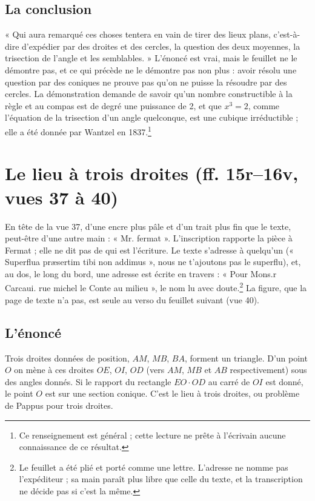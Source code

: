 \documentclass[11pt,a4paper]{article}
\begin{document}
\subsection*{La conclusion}

« Qui aura remarqué ces choses tentera en vain de tirer des lieux plans,
c'est-à-dire d'expédier par des droites et des cercles, la question des deux
moyennes, la trisection de l'angle et les semblables. » L'énoncé est vrai, mais
le feuillet ne le démontre pas, et ce qui précède ne le démontre pas non plus :
avoir résolu une question par des coniques ne prouve pas qu'on ne puisse la
résoudre par des cercles. La démonstration demande de savoir qu'un nombre
constructible à la règle et au compas est de degré une puissance de 2, et que
$x^3 = 2$, comme l'équation de la trisection d'un angle quelconque, est une
cubique irréductible ; elle a été donnée par Wantzel en 1837.\footnote{Ce
renseignement est général ; cette lecture ne prête à l'écrivain aucune
connaissance de ce résultat.}

\section*{Le lieu à trois droites (ff. 15r–16v, vues 37 à 40)}

En tête de la vue 37, d'une encre plus pâle et d'un trait plus fin que le
texte, peut-être d'une autre main : « Mr. fermat ». L'inscription rapporte la
pièce à Fermat ; elle ne dit pas de qui est l'écriture. Le texte s'adresse à
quelqu'un (« Superflua præsertim tibi non addimus », nous ne t'ajoutons pas le
superflu), et, au dos, le long du bord, une adresse est écrite en travers :
« Pour Mons.r Carcaui. rue michel le Conte au milieu », le nom lu avec
doute.\footnote{Le feuillet a été plié et porté comme une lettre. L'adresse ne
nomme pas l'expéditeur ; sa main paraît plus libre que celle du texte, et la
transcription ne décide pas si c'est la même.} La figure, que la page de texte
n'a pas, est seule au verso du feuillet suivant (vue 40).

\subsection*{L'énoncé}

Trois droites données de position, $AM$, $MB$, $BA$, forment un triangle. D'un
point $O$ on mène à ces droites $OE$, $OI$, $OD$ (vers $AM$, $MB$ et $AB$
respectivement) sous des angles donnés. Si le rapport du rectangle
$EO\cdot OD$ au carré de $OI$ est donné, le point $O$ est sur une section
conique. C'est le lieu à trois droites, ou problème de Pappus pour trois
droites.
\end{document}
